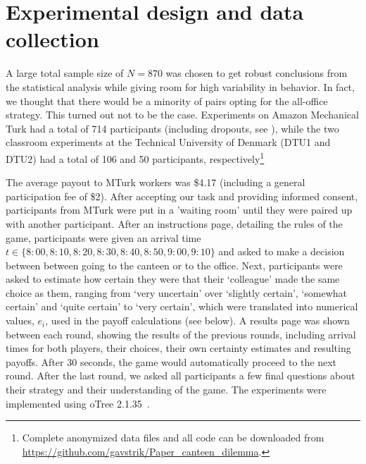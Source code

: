 

\section{Experimental design and data collection} A large total sample size of $N=870$ was chosen to get robust conclusions from the statistical analysis while giving room for high variability in behavior. In fact, we thought that there would be a minority of pairs
opting for the all-office strategy. This turned out not to be the case. Experiments on Amazon Mechanical Turk had a total of 714 participants (including dropouts, see ), while the two classroom experiments at the Technical University of Denmark (DTU1 and DTU2) had a total of 106 and 50 participants, respectively\footnote{Complete anonymized data files and all code can be downloaded from \url{https://github.com/gavstrik/Paper_canteen_dilemma}.}

The average payout to MTurk workers was \$4.17 (including a general participation fee of \$2). After accepting our task and providing informed consent, participants from MTurk were put in a ’waiting room’ until they were paired up with another participant. After an instructions page, detailing the rules of the game, participants were given an arrival time $t \in \{8{:}00, 8{:}10, 8{:}20, 8{:}30, 8{:}40, 8{:}50, 9{:}00,9{:}10\}$ and asked to make a decision between between going to the canteen or to the office. Next, participants were asked to estimate how certain they were that their `colleague' made the same choice as them, ranging from `very uncertain' over `slightly certain', `somewhat certain' and `quite certain' to `very certain', which were translated  into numerical values, $e_i$, used in the payoff calculations (see below). A results page was shown between each round, showing the results of the previous rounds, including arrival times for both players, their choices, their own certainty estimates and resulting payoffs. After 30 seconds, the game would automatically proceed to the next round. After the last round, we asked all participants a few final questions about their strategy and their understanding of the game. The experiments were implemented using oTree 2.1.35~\cite{ChenSchongerWickens16}.

